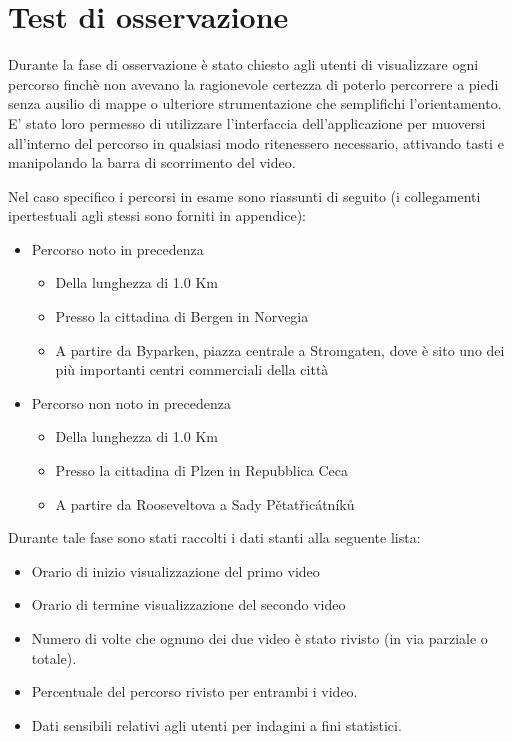 \documentclass[12pt,a4paper,openright, notitlepage]{report}
\begin{document}
\section{Test di osservazione}

Durante la fase di osservazione è stato chiesto agli utenti di visualizzare ogni percorso finchè non avevano la ragionevole certezza di poterlo percorrere a piedi senza ausilio di mappe o ulteriore strumentazione che semplifichi l’orientamento. E’ stato loro permesso di utilizzare l’interfaccia dell’applicazione per muoversi all’interno del percorso in qualsiasi modo ritenessero necessario, attivando tasti e manipolando la barra di scorrimento del video.

Nel caso specifico i percorsi in esame sono riassunti di seguito (i collegamenti ipertestuali agli stessi sono forniti in appendice):

\begin{itemize}
	\item Percorso noto in precedenza
	\begin{itemize}
		\item Della lunghezza di 1.0 Km
		\item Presso la cittadina di Bergen in Norvegia
		\item A partire da Byparken, piazza centrale a Stromgaten, dove è sito uno dei più importanti centri commerciali della città
	\end{itemize}
	
	\item Percorso non noto in precedenza
	\begin{itemize}
		\item Della lunghezza di 1.0 Km
		\item Presso la cittadina di Plzen in Repubblica Ceca
		\item A partire da Rooseveltova a Sady Pětatřicátníků
	\end{itemize}
\end{itemize}

Durante tale fase sono stati raccolti i dati stanti alla seguente lista:

\begin{itemize}
	\item Orario di inizio visualizzazione del primo video
	\item Orario di termine visualizzazione del secondo video
	\item Numero di volte che ognuno dei due video è stato rivisto (in via parziale o totale).
	\item Percentuale del percorso rivisto per entrambi i video.
	\item Dati sensibili relativi agli utenti per indagini a fini statistici.
\end{itemize}
\end{document}
